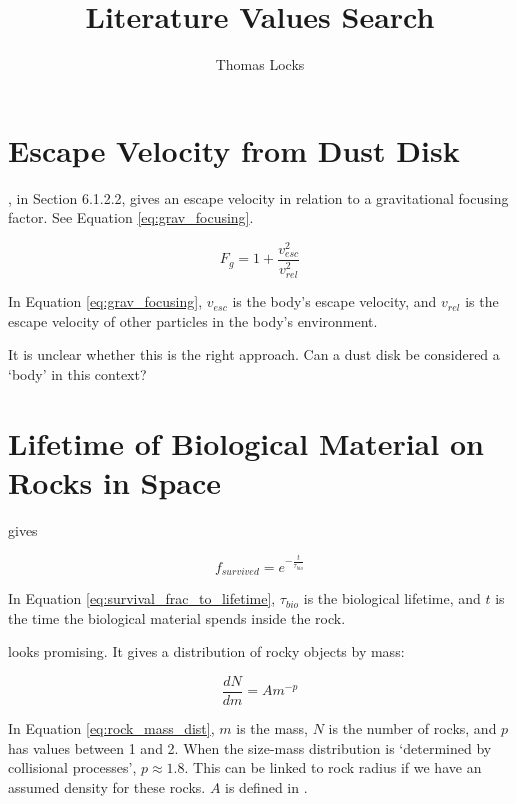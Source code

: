 \documentclass{article}
\title{Literature Values Search}
\author{Thomas Locks}
\begin{document}
\noindent
\maketitle

\section{Escape Velocity from Dust Disk}
\citet{holland2014treatise}, in Section 6.1.2.2, gives an escape velocity in relation to a gravitational focusing factor. See Equation \ref{eq:grav_focusing}.

\begin{equation}
    F_g = 1 + \frac{v_{esc}^2}{v_{rel}^2}
    \label{eq:grav_focusing}
\end{equation}

In Equation \ref{eq:grav_focusing}, $v_{esc}$ is the body's escape velocity, and $v_{rel}$ is the escape velocity of other particles in the body's environment.

It is unclear whether this is the right approach. Can a dust disk be considered a `body' in this context?

\section{Lifetime of Biological Material on Rocks in Space}
\citet{ginsburg2018galactic} gives


\begin{equation}
    f_{survived} = e^{-\frac{t}{\tau_{bio}}}
    \label{eq:survival_frac_to_lifetime}
\end{equation}

In Equation \ref{eq:survival_frac_to_lifetime}, $\tau_{bio}$ is the biological lifetime, and $t$ is the time the biological material spends inside the rock.

\citet{adams2022transfer} looks promising. It gives a distribution of rocky objects by mass:

\begin{equation}
    \frac{dN}{dm} = Am^{-p}
    \label{eq:rock_mass_dist}
\end{equation}

In Equation \ref{eq:rock_mass_dist}, $m$ is the mass, $N$ is the number of rocks, and $p$ has values between 1 and 2. When the size-mass distribution is `determined by collisional processes', $p \approx 1.8$. This can be linked to rock radius if we have an assumed density for these rocks. $A$ is defined in \citet{adams2022transfer}.
\end{document}
